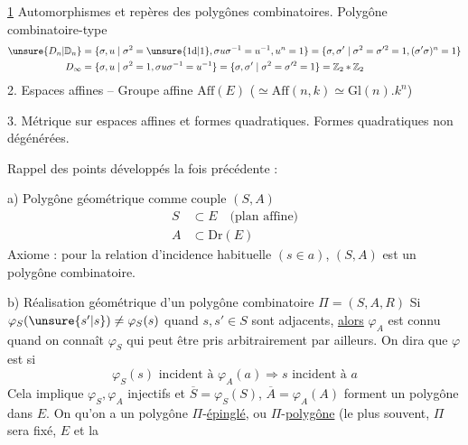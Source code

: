 \uline{1} Automorphismes et repères des polygônes combinatoires. Polygône
combinatoire-type
\[
\begin{aligned}
\unsure{D_n|\mathbb D_n}&=\{\sigma,u\mid\sigma^2=\unsure{1\mathrm d|1},\sigma u\sigma^{-1}=u^{-1},u^n=1\}=\{\sigma,\sigma'\mid\sigma^2=\sigma'^{2}=1,(\sigma'\sigma)^n=1\}\\
D_\infty&=\{\sigma,u\mid\sigma^2=1,\sigma u\sigma^{-1}=u^{-1}\}=\{\sigma,\sigma'\mid\sigma^2=\sigma'^{2}=1\}=\mathbb Z_2*\mathbb Z_2
\end{aligned}
\]
2. Espaces affines -- Groupe affine $\mathrm{Aff}(E)$ ($\simeq\mathrm{Aff}(n,k)\simeq
\mathrm{Gl}(n).k^n$)

3. Métrique sur espaces affines et formes quadratiques.
Formes quadratiques non dégénérées.

Rappel des points développés la fois précédente :

a) Polygône géométrique comme couple $(S,A)$
\[
\begin{aligned}
S&\subset E\quad\text{(plan affine)}\\
A&\subset\mathrm{Dr}(E)
\end{aligned}
\]
Axiome : pour la relation d'incidence habituelle
$(s\in a)$, $(S,A)$ est un polygône combinatoire.

b) Réalisation géométrique d'un polygône
combinatoire $\Pi=(S,A,R)$
Si $\varphi_S(\unsure{s'|s})\ne\varphi_S(s)$ quand $s,s'\in S$ sont adjacents, \uline{alors}
$\varphi_A$ est connu quand on connaît $\varphi_S$ qui peut être
pris arbitrairement par ailleurs. On dira que
$\varphi$ est   si
\[
\varphi_S(s)\text{ incident à }\varphi_A(a)\Longrightarrow s\text{ incident à }a
\]
Cela implique $\varphi_S,\varphi_A$ injectifs et $\overline S=\varphi_S(S)$, $\overline A=\varphi_A(A)$
forment un  polygône dans $E$. On  
qu'on a un polygône $\Pi$-\uline{épinglé}, ou $\Pi$-\uline{polygône} (le plus souvent, $\Pi$ sera fixé, $E$ et la
